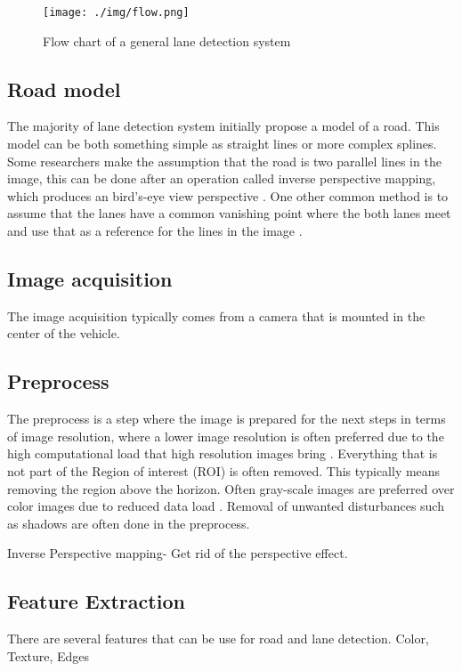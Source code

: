 \begin{figure}[H]
  \texttt{[image: ./img/flow.png]}
  \centering
  \caption{Flow chart of a general lane detection system}
  \label{fig:Software architecture of the EMC2 platform}
\end{figure}


\subsection{Road model}
The majority of lane detection system initially propose a model of a road. This model can be both something simple as straight lines or more complex splines. Some researchers make the assumption that the road is two parallel lines in the image, this can be done after an operation called inverse perspective mapping, which produces an bird's-eye view  perspective \cite{bertozzi1998gold}. One other common method is to assume that the lanes have a common vanishing point where the both lanes meet and use that as a reference for the lines in the image \cite{Yenikaya:2013:KVR:2522968.2522970}\cite{jingyu2013lane}.
\subsection{Image acquisition}
The image acquisition typically comes from a camera that is mounted in the center of the vehicle.
\subsection{Preprocess}
The preprocess is a step where the image is prepared for the next steps in terms of image resolution, where a lower image resolution is often preferred due to the high computational load that high resolution images bring \cite{Yenikaya:2013:KVR:2522968.2522970}. Everything that is not part of the Region of interest (ROI) is often removed. This typically means removing the region above the horizon. Often gray-scale images are preferred over color images due to reduced data load \cite{Yenikaya:2013:KVR:2522968.2522970}. Removal of unwanted disturbances such as shadows are often done in the preprocess. 


Inverse Perspective mapping- Get rid of the perspective effect. 

\subsection{Feature Extraction}
There are several features that can be use for road and lane detection. Color, Texture, Edges

